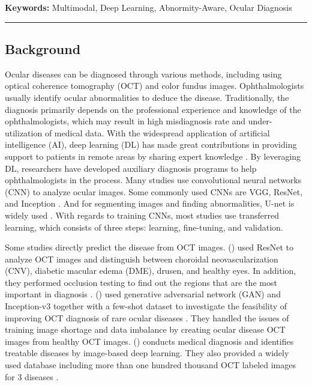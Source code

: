 \documentclass{article}
\newcommand{\authyear}[1]{\citeauthor{#1} (\citeyear{#1})}
\begin{document}
	\vspace{0.2cm}
	{\fontsize{12pt}{12pt}\selectfont \hspace{-0.8cm}\textbf{Keywords: }Multimodal, Deep Learning, Abnormity-Aware, Ocular Diagnosis}
	\vspace{0.3cm}
	\hrule
	
	\tableofcontents
	
	\begin{multicols}{2}
	\section{Background}
	Ocular diseases can be diagnosed through various methods, including using optical coherence tomography (OCT) and color fundus images. Ophthalmologists usually identify ocular abnormalities to deduce the disease. Traditionally, the diagnosis primarily depends on the professional experience and knowledge of the ophthalmologists, which may result in high misdiagnosis rate and under-utilization of medical data. With the widespread application of artificial intelligence (AI), deep learning (DL) has made great contributions in providing support to patients in remote areas by sharing expert knowledge \autocite{Ichhpujani_Thakur_2021}. By leveraging DL, researchers have developed auxiliary diagnosis programs to help ophthalmologists in the process. Many studies use convolutional neural networks (CNN) to analyze ocular images. Some commonly used CNNs are VGG, ResNet, and Inception \autocite{daich2023artificial}. And for segmenting images and finding abnormalities, U-net is widely used \autocite{Ronneberger_Fischer_Brox_2015}. With regards to training CNNs, most studies use transferred learning, which consists of three steps: learning, fine-tuning, and validation.
	
	Some studies directly predict the disease from OCT images.
	\authyear{li2019deep} used ResNet to analyze OCT images and distinguish between choroidal neovascularization (CNV), diabetic macular edema (DME), drusen, and healthy eyes. In addition, they performed occlusion testing to find out the regions that are the most important in diagnosis \autocite{li2019deep}. 
	\authyear{yoo2021feasibility} used generative adversarial network (GAN) and Inception-v3 together with a few-shot dataset to investigate the feasibility of improving OCT diagnosis of rare ocular diseases \autocite{yoo2021feasibility}. They handled the issues of training image shortage and data imbalance by creating ocular disease OCT images from healthy OCT images. \authyear{Kermany2018} conducts medical diagnosis and identifies treatable diseases by image-based deep learning. They also provided a widely used database including more than one hundred thousand OCT labeled images for 3 diseases \autocite{Kermany2018}.
	

\end{multicols}
\end{document}
